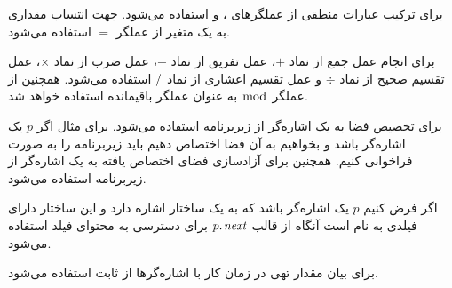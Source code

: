 برای ترکیب عبارات منطقی از عملگرهای {}، {} و {} استفاده می‌شود. جهت انتساب مقداری به یک متغیر از عملگر {$=$} استفاده می‌شود.

برای انجام عمل جمع از نماد {$+$}، عمل تفریق از نماد {$-$}، عمل ضرب از نماد {$\times$}، عمل تقسیم صحیح از نماد {$\div$} و عمل تقسیم اعشاری از نماد {$\operatorname{/}$} استفاده می‌شود. همچنین از عملگر {$\bmod$} به عنوان عملگر باقیمانده استفاده خواهد شد.

برای تخصیص فضا به یک اشاره‌گر از زیربرنامه {} استفاده می‌شود. برای مثال اگر {$p$} یک اشاره‌گر باشد و بخواهیم به آن فضا اختصاص دهیم باید زیربرنامه {} را به صورت {} فراخوانی کنیم. همچنین برای آزادسازی فضای اختصاص یافته به یک اشاره‌گر از زیربرنامه {} استفاده می‌شود.

اگر فرض کنیم {$p$} یک اشاره‌گر باشد که به یک ساختار اشاره دارد و این ساختار دارای فیلدی به نام {} است آنگاه از قالب {$p.\hspace*{1pt}\mathit{next}$} برای دسترسی به محتوای فیلد {} استفاده می‌شود.

برای بیان مقدار تهی در زمان کار با اشاره‌گرها از ثابت {} استفاده می‌شود.